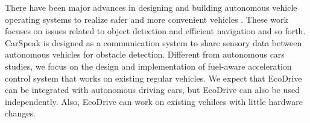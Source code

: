 There have been major advances in designing and
building autonomous vehicle operating systems to 
realize safer and more convenient vehicles 
\cite{googledriverlesscar, urmson2008autonomous, litman2013autonomous, kim2013towards}. 
These work focuses on issues related to object detection and efficient navigation and so forth. 
CarSpeak \cite{kumar2012carspeak} is designed as a communication system to share sensory
data between autonomous vehicles for obstacle detection.
Different from autonomous cars studies, 
we focus on the design and implementation of 
fuel-aware acceleration control system that works on existing regular vehicles. 
We expect that EcoDrive can be integrated with autonomous driving cars, 
but EcoDrive can also be used independently. 
Also, EcoDrive can work on existing vehilces with little hardware changes. 



 

